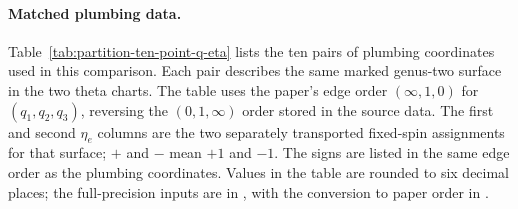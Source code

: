 \paragraph{Matched plumbing data.}
Table~\ref{tab:partition-ten-point-q-eta} lists the ten pairs of
plumbing coordinates used in this comparison. Each pair describes
the same marked genus-two surface in the two theta charts.
The table uses the paper's edge order $(\infty,1,0)$ for
$(q_1,q_2,q_3)$, reversing the $(0,1,\infty)$ order stored in the
source data.
The first and second $\eta_e$ columns are the two separately
transported fixed-spin assignments for that surface; $+$ and $-$
mean $+1$ and $-1$. The signs are listed in the same edge order
as the plumbing coordinates. Values in the table are rounded to six
decimal places; the full-precision inputs are in
,
with the conversion to paper order in
.

